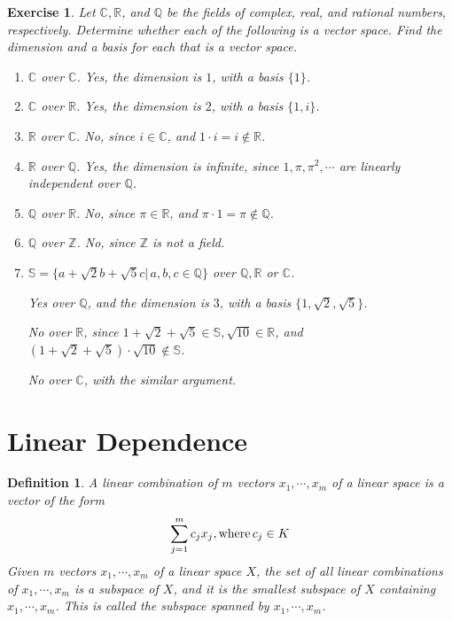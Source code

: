 \documentclass[11pt]{book}
\newtheorem{definition}{Definition}[section]
\newtheorem{exercise}{Exercise}[section]
\theoremstyle{definition}
\numberwithin{equation}{subsection}
\begin{document}
\medskip

\begin{exercise}\label{ex_6}\cite{1}
Let $\mathbb{C},\mathbb{R}$, and $\mathbb{Q}$ be the fields of complex, real, and rational numbers, respectively. Determine whether each of the following is a vector space. Find the dimension and a basis for each that is a vector space.
\begin{enumerate}[label=(\alph*)]
    \item $\mathbb{C}$ over $\mathbb{C}$. Yes, the dimension is $1$, with a basis $\{1\}$.
    \item $\mathbb{C}$ over $\mathbb{R}$. Yes, the dimension is $2$, with a basis $\{1, i\}$.
    \item $\mathbb{R}$ over $\mathbb{C}$. No, since $i\in\mathbb{C}$, and $1\cdot i = i\notin\mathbb{R}$.
    \item $\mathbb{R}$ over $\mathbb{Q}$. Yes, the dimension is infinite, since $1,\pi,\pi^2,\cdots$ are linearly independent over $\mathbb{Q}$.
    \item $\mathbb{Q}$ over $\mathbb{R}$. No, since $\pi\in\mathbb{R}$, and $\pi\cdot 1 = \pi\notin\mathbb{Q}$.
    \item $\mathbb{Q}$ over $\mathbb{Z}$. No, since $\mathbb{Z}$ is not a field.
    \item $\mathbb{S} = \{a+\sqrt{2}b+\sqrt{5}c|\, a,b,c\in\mathbb{Q}\}$ over $\mathbb{Q},\mathbb{R}$ or $\mathbb{C}$. 
    
    Yes over $\mathbb{Q}$, and the dimension is $3$, with a basis $\{1,\sqrt{2},\sqrt{5}\}$. 
    
    No over $\mathbb{R}$, since $1+\sqrt{2}+\sqrt{5}\in\mathbb{S}, \sqrt{10}\in\mathbb{R}$, and $(1+\sqrt{2}+\sqrt{5})\cdot \sqrt{10}\notin\mathbb{S}$.
    
    No over $\mathbb{C}$, with the similar argument.
\end{enumerate}
\end{exercise}

\medskip

\section{Linear Dependence}

\begin{definition}
A linear combination of $m$ vectors $x_1,\cdots, x_m$ of a linear space is a vector of the form
\begin{align*}
    \sum^m_{j=1} c_j x_j, {\rm where}\, c_j \in K
\end{align*}
Given $m$ vectors $x_1,\cdots, x_m$ of a linear space $X$, the set of all linear combinations of $x_1,\cdots, x_m$ is a subspace of $X$, and it is the smallest subspace of $X$
containing $x_1,\cdots, x_m$. This is called the subspace spanned by $x_1,\cdots, x_m$.
\end{definition}
\end{document}
